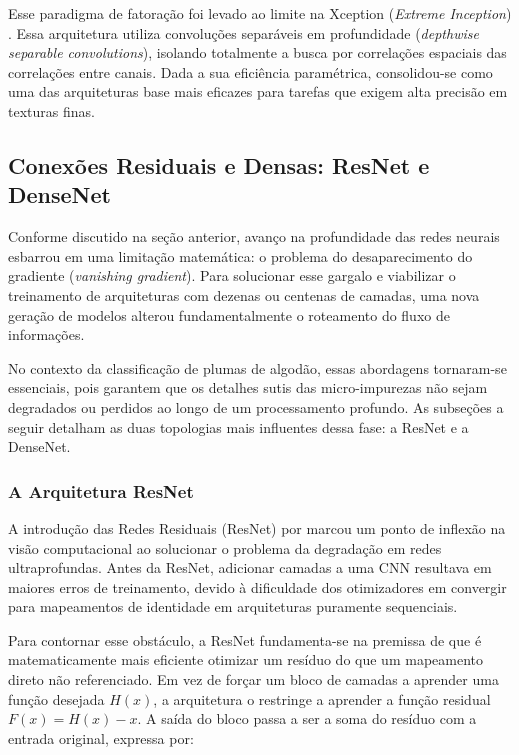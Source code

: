         Esse paradigma de fatoração foi levado ao limite na Xception (\textit{Extreme Inception}) \cite{chollet2017xception}. Essa arquitetura utiliza convoluções separáveis em profundidade (\textit{depthwise separable convolutions}), isolando totalmente a busca por correlações espaciais das correlações entre canais. Dada a sua eficiência paramétrica, consolidou-se como uma das arquiteturas base mais eficazes para tarefas que exigem alta precisão em texturas finas.



\subsection{Conexões Residuais e Densas: ResNet e DenseNet}

    Conforme discutido na seção anterior, avanço na profundidade das redes neurais esbarrou em uma limitação matemática: o problema do desaparecimento do gradiente (\textit{vanishing gradient}). Para solucionar esse gargalo e viabilizar o treinamento de arquiteturas com dezenas ou centenas de camadas, uma nova geração de modelos alterou fundamentalmente o roteamento do fluxo de informações.

    No contexto da classificação de plumas de algodão, essas abordagens tornaram-se essenciais, pois garantem que os detalhes sutis das micro-impurezas não sejam degradados ou perdidos ao longo de um processamento profundo. As subseções a seguir detalham as duas topologias mais influentes dessa fase: a ResNet e a DenseNet.

    \subsubsection{A Arquitetura ResNet}

        A introdução das Redes Residuais (ResNet) por  marcou um ponto de inflexão na visão computacional ao solucionar o problema da degradação em redes ultraprofundas. Antes da ResNet, adicionar camadas a uma CNN resultava em maiores erros de treinamento, devido à dificuldade dos otimizadores em convergir para mapeamentos de identidade em arquiteturas puramente sequenciais.

        Para contornar esse obstáculo, a ResNet fundamenta-se na premissa de que é matematicamente mais eficiente otimizar um resíduo do que um mapeamento direto não referenciado. Em vez de forçar um bloco de camadas a aprender uma função desejada $H(x)$, a arquitetura o restringe a aprender a função residual $F(x)=H(x)-x$. A saída do bloco passa a ser a soma do resíduo com a entrada original, expressa por:
        
